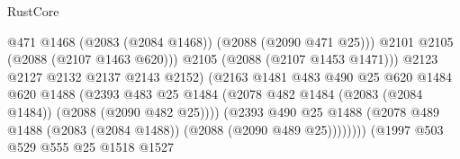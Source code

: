 \begin{lexlean}{RustCore}
\begin{coremodule}
                                                  @471
                                                  @1468
                                                  (@2083 (@2084 @1468))
                                                  (@2088 (@2090 @471 @25)))
                                                @2101
                                                @2105
                                                (@2088 (@2107 @1463 @620)))
                                              @2105
                                              (@2088 (@2107 @1453 @1471)))
                                            @2123
                                            @2127
                                            @2132
                                            @2137
                                            @2143
                                            @2152)
                                          (@2163
                                            @1481
                                            @483
                                            @490
                                            @25
                                            @620
                                            @1484
                                            @620
                                            @1488
                                            (@2393
                                              @483
                                              @25
                                              @1484
                                              (@2078
                                                @482
                                                @1484
                                                (@2083 (@2084 @1484))
                                                (@2088 (@2090 @482 @25))))
                                            (@2393
                                              @490
                                              @25
                                              @1488
                                              (@2078
                                                @489
                                                @1488
                                                (@2083 (@2084 @1488))
                                                (@2088 (@2090 @489 @25))))))))
                                    (@1997
                                      @503
                                      @529
                                      @555
                                      @25
                                      @1518
                                      @1527

\end{coremodule}
\end{lexlean}

